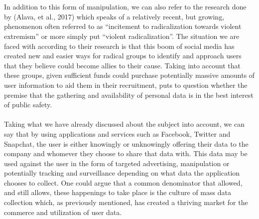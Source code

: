 \documentclass[11pt]{article}
\begin{document}
\\ \\
In addition to this form of manipulation, we can also refer to the research done by (Alava, et al., 2017) which speaks of a relatively recent, but growing, phenomenon often referred to as “incitement to radicalization towards violent extremism” or more simply put “violent radicalization”. The situation we are faced with according to their research is that this boom of social media has created new and easier ways for radical groups to identify and approach users that they believe could become allies to their cause. Taking into account that these groups, given sufficient funds could purchase potentially massive amounts of user information to aid them in their recruitment, puts to question whether the premise that the gathering and availability of personal data is in the best interest of public safety. 
\\ \\
Taking what we have already discussed about the subject into account, we can say that by using applications and services such as Facebook, Twitter and Snapchat, the user is either knowingly or unknowingly offering their data to the company and whomever they choose to share that data with. This data may be used against the user in the form of targeted advertising, manipulation or potentially tracking and surveillance depending on what data the application chooses to collect. One could argue that a common denominator that allowed, and still allows, these happenings to take place is the culture of mass data collection which, as previously mentioned, has created a thriving market for the commerce and utilization of user data.  
\\
\end{document}
